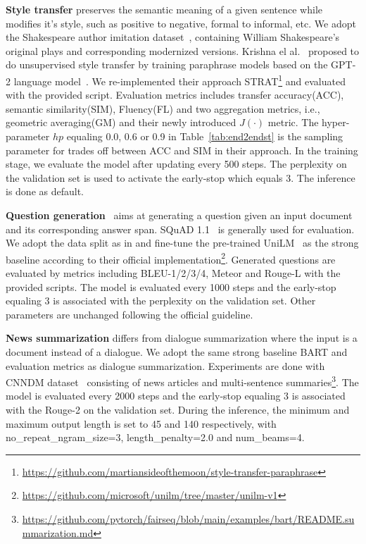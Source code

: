 \textbf{Style transfer} preserves the semantic meaning of a given sentence while modifies it's style, such as positive to negative, formal to informal, etc.
We adopt the Shakespeare author imitation dataset~\cite{xu2012paraphrasing}, containing William Shakespeare's original plays and corresponding modernized versions. Krishna el al.~ proposed to do unsupervised style transfer by training paraphrase models based on the GPT-2 language model~\cite{radford2019language}. We re-implemented their approach STRAT\footnote{\url{https://github.com/martiansideofthemoon/style-transfer-paraphrase}} and evaluated with the provided script. Evaluation metrics includes 
transfer accuracy(ACC), semantic similarity(SIM), Fluency(FL) and two aggregation metrics, i.e., geometric averaging(GM) and their newly introduced $J(\cdot)$ metric. The hyper-parameter $hp$ equaling 0.0, 0.6 or 0.9  in Table~\ref{tab:end2endst} is the sampling parameter for trades off between ACC and SIM in their approach. 
In the training stage, we evaluate the model after updating every 500 steps. The perplexity on the validation set is used to activate the early-stop which equals 3. The inference is done as default.
 
\textbf{Question generation}~\cite{zhou2017neural} aims at generating a question given an input document and its corresponding answer span. SQuAD 1.1~\cite{rajpurkar2016squad} is generally used for evaluation. We adopt the data split as in \cite{du2017learning} and fine-tune the pre-trained UniLM~\cite{dong2019unified} as the strong baseline according to their official implementation\footnote{\url{https://github.com/microsoft/unilm/tree/master/unilm-v1}}. Generated questions are evaluated by metrics including BLEU-1/2/3/4, Meteor and Rouge-L with the provided scripts. The model is evaluated every 1000 steps and the early-stop equaling 3 is associated with the perplexity on the validation set. Other parameters are unchanged following the official guideline.

\textbf{News summarization} differs from dialogue summarization where the input is a document instead of a dialogue. We adopt the same strong baseline BART and evaluation metrics as dialogue summarization. Experiments are done with CNNDM dataset~\cite{HermannKGEKSB15} consisting of news articles and multi-sentence summaries\footnote{\url{https://github.com/pytorch/fairseq/blob/main/examples/bart/README.summarization.md}}. The model is evaluated every 2000 steps and the early-stop equaling 3 is associated with the Rouge-2 on the validation set. During the inference, the minimum and maximum output length is set to 45 and 140 respectively, with no\_repeat\_ngram\_size=3, length\_penalty=2.0 and num\_beams=4.

